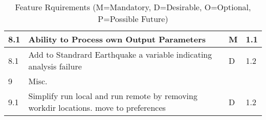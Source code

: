 \begin{table}[hbt!]
\begin{adjustbox}{max width=\textwidth}
\begin{tabular}{llll}
	8.1 & Ability to Process own Output Parameters & M & 1.1  \\ \hline
	8.1 & Add to Standrard Earthquake a variable indicating analysis failure & D & 1.2  \\ \hline
	9 & Misc. &  &  \\ \hline
	9.1 & Simplify run local and run remote by removing workdir locations. move to preferences & D & 1.2  \\ \hline
      \bottomrule                                  
  \end{tabular}
\end{adjustbox}
  \caption{Feature Rquirements (M=Mandatory, D=Desirable, O=Optional, P=Possible Future)}             
  \label{tab:featureRequirements}                 
\end{table}


